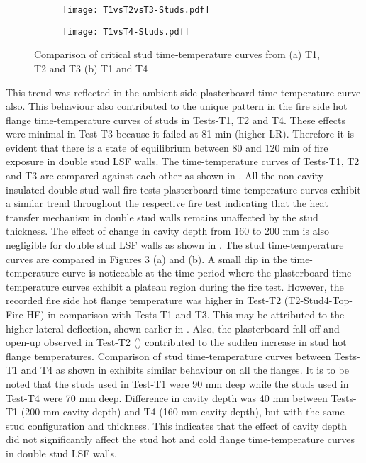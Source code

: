 \begin{figure}[!htbp]
	\centering
	\begin{subfigure}[b]{0.7\textwidth}
		\centering
		\texttt{[image: T1vsT2vsT3-Studs.pdf]}
		\caption{}
		\label{subfig:T1vsT2vsT3-Studs}
	\end{subfigure}
	\begin{subfigure}[b]{0.7\textwidth}
		\centering
		\texttt{[image: T1vsT4-Studs.pdf]}
		\caption{}
		\label{subfig:T1vsT4-Studs}
	\end{subfigure}
	   \caption{Comparison of critical stud time-temperature curves from (a) T1, T2 and T3 (b) T1 and T4}
	   \label{fig:T1vsT2vsT3vsT4-Studs}
\end{figure}

This trend was reflected in the ambient side plasterboard time-temperature curve also. This behaviour also contributed to the unique pattern in the fire side hot flange time-temperature curves of studs in Tests-T1, T2 and T4. These effects were minimal in Test-T3 because it failed at 81 min (higher LR). Therefore it is evident that there is a state of equilibrium between 80 and 120 min of fire exposure in double stud LSF walls. The time-temperature curves of Tests-T1, T2 and T3 are compared against each other as shown in . All the non-cavity insulated double stud wall fire tests plasterboard time-temperature curves exhibit a similar trend throughout the respective fire test indicating that the heat transfer mechanism in double stud walls remains unaffected by the stud thickness. The effect of change in cavity depth from 160 to 200 mm is also negligible for double stud LSF walls as shown in . The stud time-temperature curves are compared in Figures \ref{fig:T1vsT2vsT3vsT4-Studs} (a) and (b). A small dip in the time-temperature curve is noticeable at the time period where the plasterboard time-temperature curves exhibit a plateau region during the fire test. However, the recorded fire side hot flange temperature was higher in Test-T2 (T2-Stud4-Top-Fire-HF) in comparison with Tests-T1 and T3. This may be attributed to the higher lateral deflection, shown earlier in . Also, the plasterboard fall-off and open-up observed in Test-T2 () contributed to the sudden increase in stud hot flange temperatures. Comparison of stud time-temperature curves between Tests-T1 and T4 as shown in  exhibits similar behaviour on all the flanges. It is to be noted that the studs used in Test-T1 were 90 mm deep while the studs used in Test-T4 were 70 mm deep. Difference in cavity depth was 40 mm between Tests-T1 (200 mm cavity depth) and T4 (160 mm cavity depth), but with the same stud configuration and thickness. This indicates that the effect of cavity depth did not significantly affect the stud hot and cold flange time-temperature curves in double stud LSF walls. 

